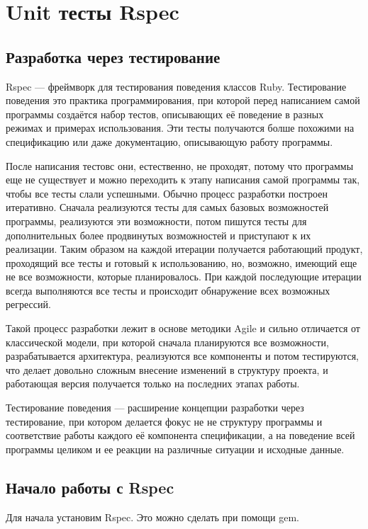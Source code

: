 \chapter{Unit тесты Rspec}

\section{Разработка через тестирование}

Rspec --- фреймворк для тестирования поведения классов Ruby. Тестирование поведения это практика программирования, при которой перед написанием самой программы создаётся набор тестов, описывающих её поведение в разных режимах и примерах использования. Эти тесты получаются болше похожими на спецификацию или даже документацию, описывающую работу программы.

После написания тестовс они, естественно, не проходят, потому что программы еще не существует и можно переходить к этапу написания самой программы так, чтобы все тесты слали успешными. Обычно процесс разработки построен итеративно. Сначала реализуются тесты для самых базовых возможностей программы, реализуются эти возможности, потом пишутся тесты для дополнительных более продвинутых возможностей и приступают к их реализации. Таким образом на каждой итерации получается работающий продукт, проходящий все тесты и готовый к использованию, но, возможно, имеющий еще не все возможности, которые планировалось. При каждой последующие итерации всегда выполняются все тесты и происходит обнаружение всех возможных регрессий.

Такой процесс разработки лежит в основе методики Agile и сильно отличается от классической модели, при которой сначала планируются все возможности, разрабатывается архитектура, реализуются все компоненты и потом тестируются, что делает довольно сложным внесение изменений в структуру проекта, и работающая версия получается только на последних этапах работы.

Тестирование поведения --- расширение концепции разработки через тестирование, при котором делается фокус не не структуру программы и соответствие работы каждого её компонента спецификации, а на поведение всей программы целиком и ее реакции на различные ситуации и исходные данные.

\section{Начало работы с Rspec}

Для начала установим Rspec. Это можно сделать при помощи gem.

